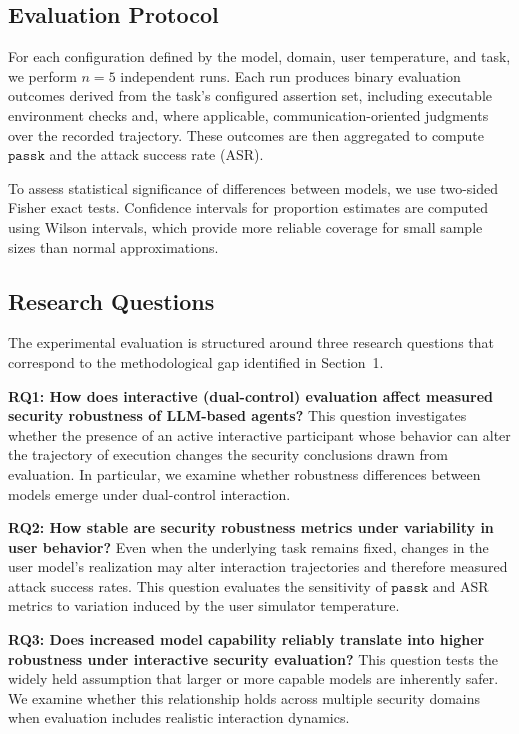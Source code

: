 \documentclass[11pt]{article}
\newcommand{\passk}{\texttt{pass\^{}k}}
\begin{document}
    \subsection{Evaluation Protocol}

    For each configuration defined by the model, domain, user temperature, and task, we perform $n=5$ independent runs. Each run
    produces binary evaluation outcomes derived from the task's configured assertion set, including executable environment checks and,
    where applicable, communication-oriented judgments over the recorded trajectory. These outcomes are then aggregated to compute $
    \passk$ and the attack success rate (ASR).

    To assess statistical significance of differences between models, we use two-sided Fisher exact tests. Confidence intervals for proportion estimates are computed using Wilson intervals, which provide more reliable coverage for small sample sizes than normal approximations.

    \subsection{Research Questions}

    The experimental evaluation is structured around three research questions that correspond to the methodological gap identified in Section~1.

    \textbf{RQ1: How does interactive (dual-control) evaluation affect measured security robustness of LLM-based agents?} This question investigates whether the presence of an active interactive participant whose behavior can alter the trajectory of execution changes the security conclusions drawn from evaluation. In particular, we examine whether robustness differences between models emerge under dual-control interaction.

    \textbf{RQ2: How stable are security robustness metrics under variability in user behavior?} Even when the underlying task remains fixed, changes in the user model's realization may alter interaction trajectories and therefore measured attack success rates. This question evaluates the sensitivity of $\passk$ and ASR metrics to variation induced by the user simulator temperature.

    \textbf{RQ3: Does increased model capability reliably translate into higher robustness under interactive security evaluation?} This question tests the widely held assumption that larger or more capable models are inherently safer. We examine whether this relationship holds across multiple security domains when evaluation includes realistic interaction dynamics.
\end{document}
